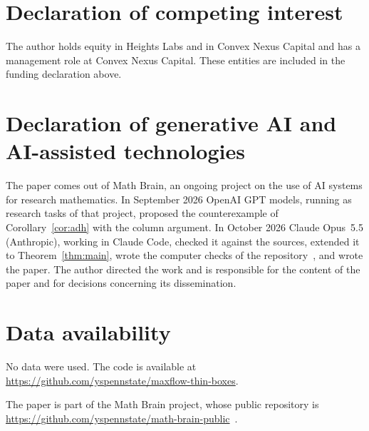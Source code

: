 \documentclass[11pt]{amsart}
\theoremstyle{definition}
\theoremstyle{remark}
\begin{document}
\section*{Declaration of competing interest}
The author holds equity in Heights Labs and in Convex Nexus Capital and
has a management role at Convex Nexus Capital. These entities are included
in the funding declaration above.

\section*{Declaration of generative AI and AI-assisted technologies}
The paper comes out of Math Brain, an ongoing project on the use of AI systems for research mathematics. In September 2026 OpenAI GPT models, running as research tasks of that project, proposed the counterexample of Corollary~\ref{cor:adh} with the column argument. In October 2026 Claude Opus~5.5 (Anthropic), working in Claude Code, checked it against the sources, extended it to Theorem~\ref{thm:main}, wrote the computer checks of the repository~\cite{code}, and wrote the paper. The author directed the work and is responsible for the content of the paper and for decisions concerning its dissemination.

\section*{Data availability}
No data were used. The code is available at\\ \url{https://github.com/yspennstate/maxflow-thin-boxes}.

The paper is part of the Math Brain project, whose public repository is \url{https://github.com/yspennstate/math-brain-public}~\cite{MathBrainRepo}.
\end{document}
